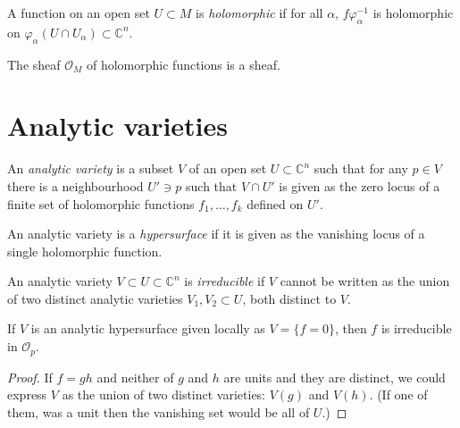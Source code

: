 \begin{definition}
\label{definition-holomorphic-function-on-complex-manifold}
A function on an open set $U\subset M$ is {\it holomorphic} if for all $\alpha$,
$f\varphi_\alpha^{-1}$ is holomorphic on 
$\varphi_\alpha(U\cap U_\alpha)\subset\mathbb{C}^n$.
\end{definition}

\begin{lemma}
\label{lemma-holomorphic-function-sheaf}
The sheaf $\mathcal{O}_M$ of holomorphic functions is a sheaf.
\end{lemma}

\section{Analytic varieties}
\label{section-analytic-varieties}

\begin{definition}
\label{definition-analytic-variety}
An {\it analytic variety} is a subset $V$ of an open set $U\subset \mathbb{C}^n$
such that for any $p\in V$ there is a neighbourhood $U'\ni p$ such that $V\cap
U'$ is given as the zero locus of a finite set of holomorphic functions
$f_1,\ldots,f_k$ defined on $U'$.
\end{definition}

\begin{definition}
\label{definition-analytic-hypersurface}
An analytic variety is a {\it hypersurface} if it is given as the vanishing
locus of a single holomorphic function.
\end{definition}

\begin{definition}
\label{definition-irreducible-variety}
An analytic variety $V\subset U\subset \mathbb{C}^n$ is {\it irreducible} if
$V$ cannot be written as the union of two distinct analytic varieties 
$V_1,V_2\subset U$, both distinct to $V$.
\end{definition}

\begin{lemma}
\label{lemma-irreducible-analytic-hypersurface-irreducible-polynomial}
If $V$ is an analytic hypersurface given locally as $V=\{f=0\}$, then $f$ is
irreducible in $\mathcal{O}_p$.
\end{lemma}

\begin{proof}
If $f=gh$ and neither of $g$ and $h$ are units and they are distinct, we could 
express $V$ as the union of two distinct varieties: $V(g)$ and $V(h)$. (If one 
of them, was a unit then the vanishing set would be all of $U$.)
\end{proof}

